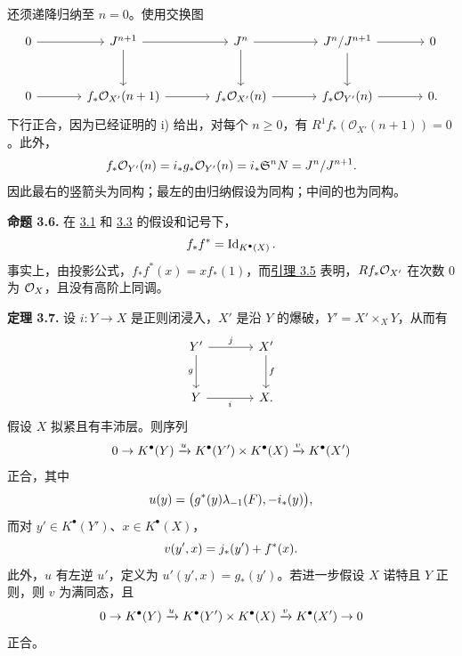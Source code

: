 还须递降归纳至 \(n=0\)。使用交换图
\[
\begin{tikzcd}[column sep=large,row sep=large]
0\arrow[r]&J^{n+1}\arrow[r]\arrow[d]&J^n\arrow[r]\arrow[d]&J^n/J^{n+1}\arrow[r]\arrow[d]&0\\
0\arrow[r]&f_*\mathcal O_{X'}(n+1)\arrow[r]&f_*\mathcal O_{X'}(n)\arrow[r]&f_*\mathcal O_{Y'}(n)\arrow[r]&0.
\end{tikzcd}
\]
下行正合，因为已经证明的 i) 给出，对每个 \(n\geq0\)，有 \(R^1f_*(\mathcal O_{X'}(n+1))=0\)。此外，
\[
 f_*\mathcal O_{Y'}(n)=i_*g_*\mathcal O_{Y'}(n)
 =i_*\mathfrak S^nN=J^n/J^{n+1}.
\]
因此最右的竖箭头为同构；最左的由归纳假设为同构；中间的也为同构。

\textbf{命题 3.6.} 在 \hyperlink{sga6.e07.para.3-1}{3.1} 和 \hyperlink{sga6.e07.para.3-3}{3.3} 的假设和记号下，
\begin{equation}\notag
f_*f^*=\operatorname{Id}_{K^\bullet(X)}.
\end{equation}
事实上，由投影公式，\(f_*f^*(x)=x f_*(1)\)，而\hyperlink{sga6.e07.lem.3-5}{引理 3.5} 表明，\(Rf_*\mathcal O_{X'}\) 在次数 \(0\) 为 \(\mathcal O_X\)，且没有高阶上同调。

\textbf{定理 3.7.} 设 \(i:Y\to X\) 是正则闭浸入，\(X'\) 是沿 \(Y\) 的爆破，\(Y'=X'\times_XY\)，从而有
\[
\begin{tikzcd}[column sep=large,row sep=large]
Y' \arrow[r,"j"] \arrow[d,"g"'] & X' \arrow[d,"f"]\\
Y \arrow[r,"i"'] & X.
\end{tikzcd}
\]
假设 \(X\) 拟紧且有丰沛层。则序列
\begin{equation}\notag
0\to K^\bullet(Y)\xrightarrow{u}K^\bullet(Y')\times K^\bullet(X)\xrightarrow{v}K^\bullet(X')
\end{equation}
正合，其中
\begin{equation}\notag
u(y)=\bigl(g^*(y)\lambda_{-1}(F),-i_*(y)\bigr),
\end{equation}
而对 \(y'\in K^\bullet(Y')\)、\(x\in K^\bullet(X)\)，
\begin{equation}\notag
v(y',x)=j_*(y')+f^*(x).
\end{equation}
此外，\(u\) 有左逆 \(u'\)，定义为 \(u'(y',x)=g_*(y')\)。若进一步假设 \(X\) 诺特且 \(Y\) 正则，则 \(v\) 为满同态，且
\begin{equation}\notag
0\to K^\bullet(Y)\xrightarrow{u}K^\bullet(Y')\times K^\bullet(X)\xrightarrow{v}K^\bullet(X')\to0
\end{equation}
正合。

